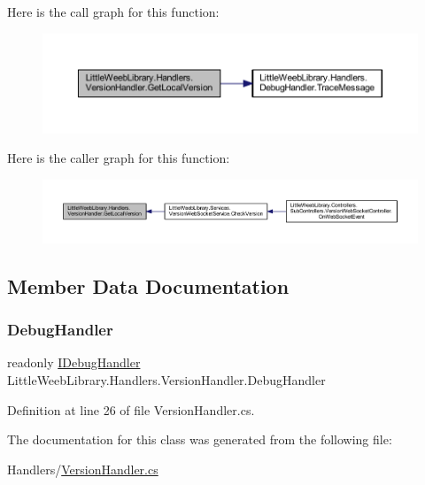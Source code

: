 Here is the call graph for this function\+:\nopagebreak
\begin{figure}[H]
\begin{center}
\leavevmode
\includegraphics[width=350pt]{class_little_weeb_library_1_1_handlers_1_1_version_handler_ac2510dcad764a9c925d8da152740f095_cgraph}
\end{center}
\end{figure}
Here is the caller graph for this function\+:\nopagebreak
\begin{figure}[H]
\begin{center}
\leavevmode
\includegraphics[width=350pt]{class_little_weeb_library_1_1_handlers_1_1_version_handler_ac2510dcad764a9c925d8da152740f095_icgraph}
\end{center}
\end{figure}


\subsection{Member Data Documentation}
\mbox{\label{class_little_weeb_library_1_1_handlers_1_1_version_handler_a9d4e181ca6b1efff96f530dd7981d6e3}} 
\subsubsection{\texorpdfstring{Debug\+Handler}{DebugHandler}}
{\footnotesize\ttfamily readonly \mbox{\hyperlink{interface_little_weeb_library_1_1_handlers_1_1_i_debug_handler}{I\+Debug\+Handler}} Little\+Weeb\+Library.\+Handlers.\+Version\+Handler.\+Debug\+Handler\hspace{0.3cm}{\ttfamily [private]}}



Definition at line 26 of file Version\+Handler.\+cs.



The documentation for this class was generated from the following file\+:\begin{DoxyCompactItemize}
\item 
Handlers/\mbox{\hyperlink{_version_handler_8cs}{Version\+Handler.\+cs}}\end{DoxyCompactItemize}
